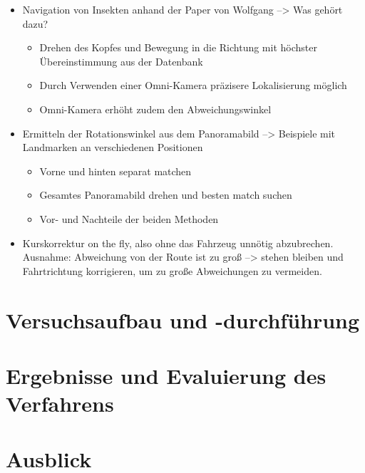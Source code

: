 \documentclass[12pt,a4paper,titlepage]{scrartcl}
\begin{document}
\begin{itemize}
\item Navigation von Insekten anhand der Paper von Wolfgang --> Was gehört dazu?
\begin{itemize}
\item Drehen des Kopfes und Bewegung in die Richtung mit höchster Übereinstimmung aus der Datenbank
\item Durch Verwenden einer Omni-Kamera präzisere Lokalisierung möglich
\item Omni-Kamera erhöht zudem den Abweichungswinkel
\end{itemize}
\item Ermitteln der Rotationswinkel aus dem Panoramabild --> Beispiele mit Landmarken an verschiedenen Positionen
\begin{itemize}
\item Vorne und hinten separat matchen
\item Gesamtes Panoramabild drehen und besten match suchen
\item Vor- und Nachteile der beiden Methoden
\end{itemize}
\item Kurskorrektur on the fly, also ohne das Fahrzeug unnötig abzubrechen. Ausnahme: Abweichung von der Route ist zu groß --> stehen bleiben und Fahrtrichtung korrigieren, um zu große Abweichungen zu vermeiden.
\end{itemize}
\pagebreak
\section{Versuchsaufbau und -durchführung}
\pagebreak
\section{Ergebnisse und Evaluierung des Verfahrens}
\pagebreak
\section{Ausblick}
\pagebreak
\renewcommand{\refname}{Quellenverzeichnis}


\end{document}
